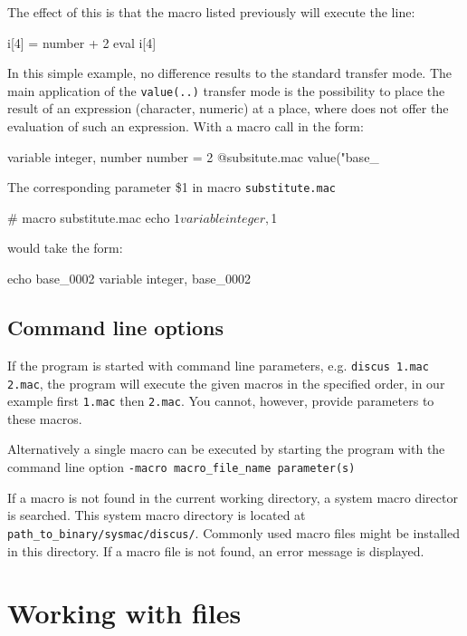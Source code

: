 The effect of this is that the macro listed previously will 
execute the line:
\begin{MacVerbatim}
     i[4] = number + 2
     eval i[4]
\end{MacVerbatim}
In this simple example, no difference results to the standard transfer
mode. The main application of the {\tt value(..)} transfer mode is the
possibility to place the result of an expression (character, numeric)
at a place, where \Suite does not offer the evaluation of such an
expression. With a macro call in the form:
\begin{MacVerbatim}
     variable integer, number
     number = 2
     @subsitute.mac value("base_%
\end{MacVerbatim}

The corresponding parameter \$1 in macro {\tt substitute.mac} 
\begin{MacVerbatim}
   # macro substitute.mac
   echo $1
   variable integer, $1
\end{MacVerbatim}

would take the form:
\begin{MacVerbatim}
   echo base_0002
   variable integer, base_0002
\end{MacVerbatim}

\par

\subsection{Command line options}
If the program is started with command line parameters,
e.g. {\tt discus 1.mac 2.mac}, the program will execute the given
macros in the specified order, in our example first {\tt 1.mac} then
{\tt 2.mac}. You cannot, however, provide parameters to these macros.

Alternatively a single macro can be executed by starting the program
with the command line option 
{\tt -macro macro\_file\_name parameter(s)}

If a macro is not found in the current working
directory, a system macro director is searched. This system macro
directory is located at {\tt path\_to\_binary/sysmac/discus/}.
Commonly used macro files might be installed in this directory.
If a macro file is not found, an error message is displayed.


\section{Working with files \label{io}}

